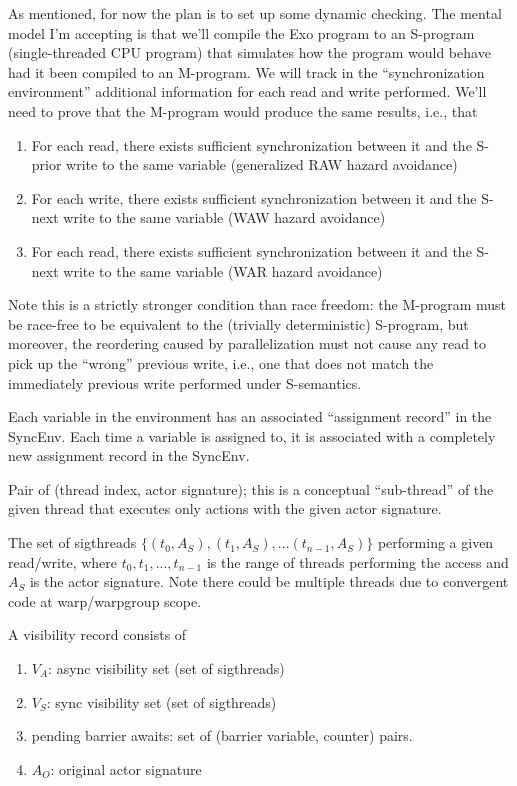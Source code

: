 \filbreak
{}

As mentioned, for now the plan is to set up some dynamic checking.
The mental model I'm accepting is that we'll compile the Exo program to an S-program (single-threaded CPU program) that simulates how the program would behave had it been compiled to an M-program.
We will track in the ``synchronization environment'' additional information for each read and write performed.
We'll need to prove that the M-program would produce the same results, i.e., that
\begin{enumerate}
  \item For each read, there exists sufficient synchronization between it and the S-prior write to the same variable (generalized RAW hazard avoidance)
  \item For each write, there exists sufficient synchronization between it and the S-next write to the same variable (WAW hazard avoidance)
  \item For each read, there exists sufficient synchronization between it and the S-next write to the same variable (WAR hazard avoidance)
\end{enumerate}

\filbreak
Note this is a strictly stronger condition than race freedom: the M-program must be race-free to be equivalent to the (trivially deterministic) S-program, but moreover, the reordering caused by parallelization must not cause any read to pick up the ``wrong'' previous write, i.e., one that does not match the immediately previous write performed under S-semantics.

\filbreak
{} Each variable in the environment has an associated ``assignment record'' in the SyncEnv.
Each time a variable is assigned to, it is associated with a completely new assignment record in the SyncEnv.

\filbreak
{} Pair of (thread index, actor signature); this is a conceptual ``sub-thread'' of the given thread that executes only actions with the given actor signature.

\filbreak
{}
The set of sigthreads $\{(t_0, A_S), (t_1, A_S), ... (t_{n-1}, A_S)\}$ performing a given read/write, where $t_0, t_1, ... ,t_{n-1}$ is the range of threads performing the access and $A_S$ is the actor signature.
Note there could be multiple threads due to convergent code at warp/warpgroup scope.

\filbreak
{} A visibility record consists of
\begin{enumerate}
  \item $V_A$: async visibility set (set of sigthreads)
  \item $V_S$: sync visibility set (set of sigthreads)
  \item pending barrier awaits: set of (barrier variable, counter) pairs.
  \item $A_O$: original actor signature
\end{enumerate}

